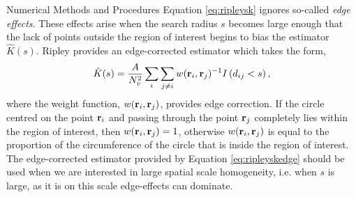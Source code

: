 \begin{chapter}{\label{cha:numerics}Numerical Methods and Procedures}
  Equation \ref{eq:ripleysk} ignores so-called {\it edge effects}. These effects arise when the search radius $s$ becomes large enough that the lack of points outside the region of interest begins to bias the estimator $\hat{K}(s)$. Ripley provides an edge-corrected estimator \cite{ripley_1976} which takes the form,
  \begin{equation}\label{eq:ripleyskedge}
    \hat{K}(s) = \frac{A}{N_v^2}\sum\limits_{i}\sum\limits_{j \ne i} w({\bf r}_i,{\bf r}_j)^{-1}I\left (d_{ij}<s\right ),
  \end{equation}
  where the weight function, $w({\bf r}_i,{\bf r}_j)$, provides edge correction. If the circle centred on  the point ${\bf r}_i$ and passing through the point ${\bf r}_j$ completely lies within the region of interest, then $w({\bf r}_i,{\bf r}_j)=1$, otherwise $w({\bf r}_i,{\bf r}_j)$ is equal to the proportion of the circumference of the circle that is inside the region of interest. The edge-corrected estimator provided by Equation \ref{eq:ripleyskedge} should be used when we are interested in large spatial scale homogeneity, i.e. when $s$ is large, as it is on this scale edge-effects can dominate.


\end{chapter}
